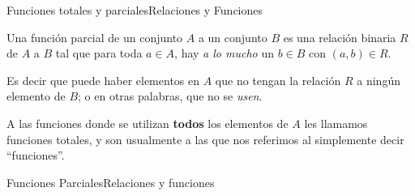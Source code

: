 \documentclass[spanish]{beamer}
\begin{document}
\begin{frame}{Funciones totales y parciales}{Relaciones y Funciones}

    \begin{definition}
        Una \alert{función parcial} de un conjunto $A$ a un conjunto $B$ es una relación binaria $R$ de $A$ a $B$ tal que para toda $a \in A$, hay \textit{a lo mucho} un $b \in B$ con $(a,b) \in R$.
    \end{definition} \pause
    \bigskip
    Es decir que puede haber elementos en $A$ que no tengan la relación $R$ a ningún elemento de $B$; o en otras palabras, que no se \textit{usen}. \pause
    
    \bigskip

    A las funciones donde se utilizan \textbf{todos} los elementos de $A$ les llamamos \alert{funciones totales}, y son usualmente a las que nos referimos al simplemente decir ``funciones''.
\end{frame}

\begin{frame}{Funciones Parciales}{Relaciones y funciones}
    \begin{center}
    \end{center}
\end{frame}
\end{document}
